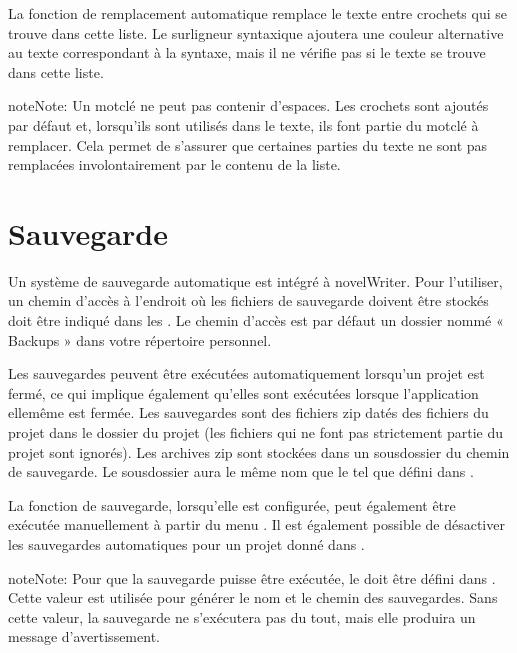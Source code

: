 \documentclass[a4paper,11pt,french]{sphinxmanual}
\begin{document}
\sphinxAtStartPar
La fonction de remplacement automatique remplace le texte entre crochets qui se trouve dans cette liste. Le surligneur syntaxique ajoutera une couleur alternative au texte correspondant à la syntaxe, mais il ne vérifie pas si le texte se trouve dans cette liste.

\begin{sphinxadmonition}{note}{Note:}
\sphinxAtStartPar
Un mot\sphinxhyphen{}clé ne peut pas contenir d’espaces. Les crochets sont ajoutés par défaut et, lorsqu’ils sont utilisés dans le texte, ils font partie du mot\sphinxhyphen{}clé à remplacer. Cela permet de s’assurer que certaines parties du texte ne sont pas remplacées involontairement par le contenu de la liste.
\end{sphinxadmonition}


\section{Sauvegarde}
\label{\detokenize{project_overview:backup}}\label{\detokenize{project_overview:a-proj-backup}}
\sphinxAtStartPar
Un système de sauvegarde automatique est intégré à novelWriter. Pour l’utiliser, un chemin d’accès à l’endroit où les fichiers de sauvegarde doivent être stockés doit être indiqué dans les . Le chemin d’accès est par défaut un dossier nommé « Backups » dans votre répertoire personnel.

\sphinxAtStartPar
Les sauvegardes peuvent être exécutées automatiquement lorsqu’un projet est fermé, ce qui implique également qu’elles sont exécutées lorsque l’application elle\sphinxhyphen{}même est fermée. Les sauvegardes sont des fichiers zip datés des fichiers du projet dans le dossier du projet (les fichiers qui ne font pas strictement partie du projet sont ignorés). Les archives zip sont stockées dans un sous\sphinxhyphen{}dossier du chemin de sauvegarde. Le sous\sphinxhyphen{}dossier aura le même nom que le  tel que défini dans {\hyperref[\detokenize{project_overview:a-proj-settings}]{}}.

\sphinxAtStartPar
La fonction de sauvegarde, lorsqu’elle est configurée, peut également être exécutée manuellement à partir du menu . Il est également possible de désactiver les sauvegardes automatiques pour un projet donné dans .

\begin{sphinxadmonition}{note}{Note:}
\sphinxAtStartPar
Pour que la sauvegarde puisse être exécutée, le  doit être défini dans . Cette valeur est utilisée pour générer le nom et le chemin des sauvegardes. Sans cette valeur, la sauvegarde ne s’exécutera pas du tout, mais elle produira un message d’avertissement.
\end{sphinxadmonition}
\end{document}
